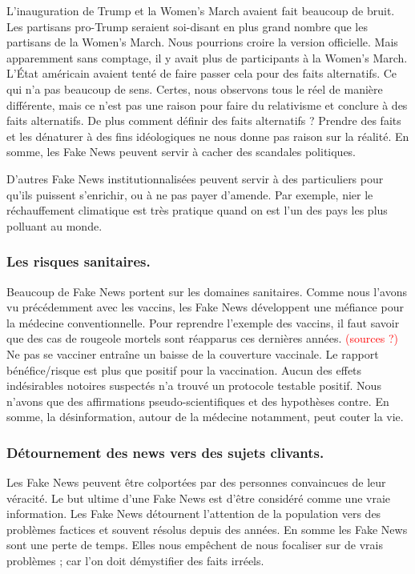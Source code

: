 L'inauguration de Trump et la Women's March avaient fait beaucoup de bruit.
Les partisans pro-Trump seraient soi-disant en plus grand nombre que les partisans de la Women's March.
Nous pourrions croire la version officielle.
Mais apparemment sans comptage, il y avait plus de participants à la Women's March.
L'État américain avaient tenté de faire passer cela pour des faits alternatifs.
Ce qui n'a pas beaucoup de sens.
Certes, nous observons tous le réel de manière différente, mais ce n'est pas une raison pour faire du relativisme et conclure à des faits alternatifs.
De plus comment définir des faits alternatifs ?
Prendre des faits et les dénaturer à des fins idéologiques ne nous donne pas raison sur la réalité.
En somme, les Fake News peuvent servir à cacher des scandales politiques.

D'autres Fake News institutionnalisées peuvent servir à des particuliers pour qu'ils puissent s'enrichir, ou à ne pas payer d'amende.
Par exemple, nier le réchauffement climatique est très pratique quand on est l'un des pays les plus polluant au monde.
\subsubsection{Les risques sanitaires.}
Beaucoup de Fake News portent sur les domaines sanitaires.
Comme nous l'avons vu précédemment avec les vaccins, les Fake News développent une méfiance pour la médecine conventionnelle.
Pour reprendre l'exemple des vaccins, il faut savoir que des cas de rougeole mortels sont réapparus ces dernières années. \textcolor{red}{(sources ?)}
Ne pas se vacciner entraîne un baisse de la couverture vaccinale.
Le rapport bénéfice/risque est plus que positif pour la vaccination.
Aucun des effets indésirables notoires suspectés n'a trouvé un protocole testable positif.
Nous n'avons que des affirmations pseudo-scientifiques et des hypothèses contre.
En somme, la désinformation, autour de la médecine notamment, peut couter la vie.

\subsubsection{Détournement des news vers des sujets clivants.}
Les Fake News peuvent être colportées par des personnes convaincues de leur véracité.
Le but ultime d'une Fake News est d'être considéré comme une vraie information.
Les Fake News détournent l'attention de la population vers des problèmes factices et souvent résolus depuis des années. En somme les Fake News sont une perte de temps. Elles nous empêchent de nous focaliser sur de vrais problèmes ; car l'on doit démystifier des faits irréels.
